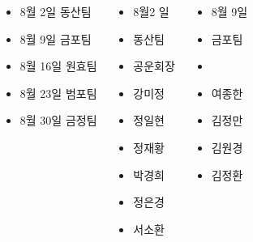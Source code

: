 \documentclass[	20pt, 
							a1paper, 
							portrait, %
							margin=0mm, %
							innermargin=10mm,  		%
							blockverticalspace=4mm, %
							colspace=5mm, 
							subcolspace=0mm
							]{tikzposter}
\begin{document}
\begin{columns}

			{				
			\setlength{\leftmargini}{3em}			
			\setlength{\labelsep}{1em} %
			\begin{itemize}
				\item 	8월	2일 동산팀
				\item 	8월 	9일 금포팀
				\item  	8월 16일 원효팀
				\item 	8월 23일 범포팀
				\item 	8월 30일 금정팀
			\end{itemize}
		}


			{
			\setlength{\leftmargini}{3em}			
			\begin{itemize}
				\item [일자]		8월2 일 
				\item [팀명]		동산팀 
				\item [팀장]		공운회장
				\item 강미정
				\item 정일현
				\item 정재황
				\item 박경희
				\item 정은경
				\item 서소환
			\end{itemize}
			}


			{
			\setlength{\leftmargini}{3em}			
			\begin{itemize}
				\item [일자]		8월 9일 
				\item [팀명]		금포팀 
				\item [팀장]		
				\item 여종한
				\item 김정만
				\item 김원경
				\item 김정환
			\end{itemize}
		}




\end{columns}
\end{document}
